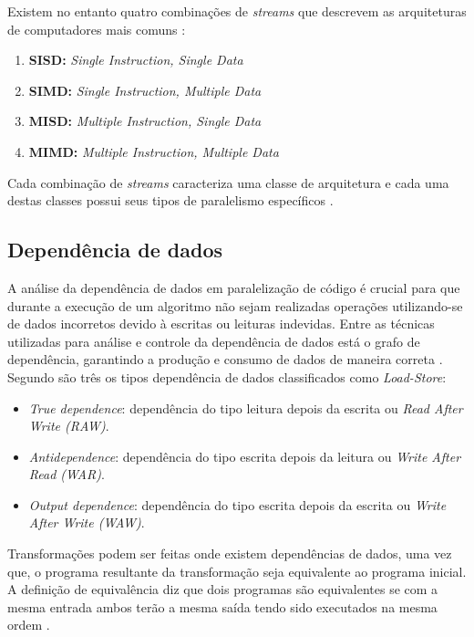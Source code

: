 \documentclass[12pt]{article}
\begin{document}
Existem no entanto quatro combinações de \textit{streams} que descrevem as 
arquiteturas de computadores mais comuns \cite{Flynn:1996}:

\begin{enumerate}
        \item \textbf{SISD:} \textit{Single Instruction, Single Data}
        \item \textbf{SIMD:} \textit{Single Instruction, Multiple Data}
        \item \textbf{MISD:} \textit{Multiple Instruction, Single Data}
        \item \textbf{MIMD:} \textit{Multiple Instruction, Multiple Data}
\end{enumerate}

Cada combinação de \textit{streams} caracteriza uma classe de arquitetura 
e cada uma destas classes possui seus tipos de paralelismo específicos \cite{eopc}.

\subsection{Dependência de dados}

A análise da dependência de dados em paralelização de código é crucial para que 
durante a execução de um algoritmo não sejam realizadas operações utilizando-se 
de dados incorretos devido à escritas ou leituras indevidas. 
Entre as técnicas utilizadas para análise e controle da dependência de dados 
está o grafo de dependência, garantindo a produção e consumo de dados de maneira 
correta \cite{aapc}.
Segundo \cite{ocfma} são três os tipos dependência de dados classificados 
como \textit{Load-Store}:
\begin{itemize}
        \item \textit{True dependence}: dependência do tipo leitura depois da 
                escrita ou \textit{Read After Write (RAW)}.
        \item \textit{Antidependence}: dependência do tipo escrita depois da 
                leitura ou \textit{Write After Read (WAR)}.
        \item \textit{Output dependence}: dependência do tipo escrita depois da 
                escrita ou \textit{Write After Write (WAW)}.
\end{itemize}
Transformações podem ser feitas onde existem dependências de dados, uma vez que, 
o programa resultante da transformação seja equivalente ao programa inicial. 
A definição de equivalência diz que dois programas são equivalentes se com a 
mesma entrada ambos terão a mesma saída tendo sido executados na mesma 
ordem \cite{ocfma}.
\end{document}
